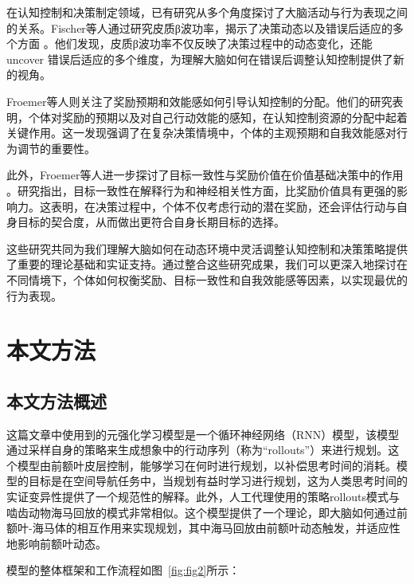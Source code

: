 \documentclass[UTF8,12pt]{article} %
\begin{document}
	在认知控制和决策制定领域，已有研究从多个角度探讨了大脑活动与行为表现之间的关系。Fischer等人通过研究皮质β波功率，揭示了决策动态以及错误后适应的多个方面 \cite{Fischer_Nigbur_Klein_Danielmeier_Ullsperger_2018}。他们发现，皮质β波功率不仅反映了决策过程中的动态变化，还能 uncover 错误后适应的多个维度，为理解大脑如何在错误后调整认知控制提供了新的视角。

	Froemer等人则关注了奖励预期和效能感如何引导认知控制的分配\cite{Froemer_Lin_Dean_Wolf_Inzlicht_Shenhav_2021}。他们的研究表明，个体对奖励的预期以及对自己行动效能的感知，在认知控制资源的分配中起着关键作用。这一发现强调了在复杂决策情境中，个体的主观预期和自我效能感对行为调节的重要性。
	
	此外，Froemer等人进一步探讨了目标一致性与奖励价值在价值基础决策中的作用\cite{Froemer_Dean_Wolf_Shenhav_2019} 。研究指出，目标一致性在解释行为和神经相关性方面，比奖励价值具有更强的影响力。这表明，在决策过程中，个体不仅考虑行动的潜在奖励，还会评估行动与自身目标的契合度，从而做出更符合自身长期目标的选择。
	
	这些研究共同为我们理解大脑如何在动态环境中灵活调整认知控制和决策策略提供了重要的理论基础和实证支持。通过整合这些研究成果，我们可以更深入地探讨在不同情境下，个体如何权衡奖励、目标一致性和自我效能感等因素，以实现最优的行为表现。

\section{本文方法}


\subsection{本文方法概述}
这篇文章中使用到的元强化学习模型是一个循环神经网络（RNN）模型，该模型通过采样自身的策略来生成想象中的行动序列（称为“rollouts”）来进行规划。这个模型由前额叶皮层控制，能够学习在何时进行规划，以补偿思考时间的消耗。模型的目标是在空间导航任务中，当规划有益时学习进行规划，这为人类思考时间的实证变异性提供了一个规范性的解释。此外，人工代理使用的策略rollouts模式与啮齿动物海马回放的模式非常相似。这个模型提供了一个理论，即大脑如何通过前额叶-海马体的相互作用来实现规划，其中海马回放由前额叶动态触发，并适应性地影响前额叶动态。

模型的整体框架和工作流程如图~\ref{fig:fig2}所示：
\end{document}
